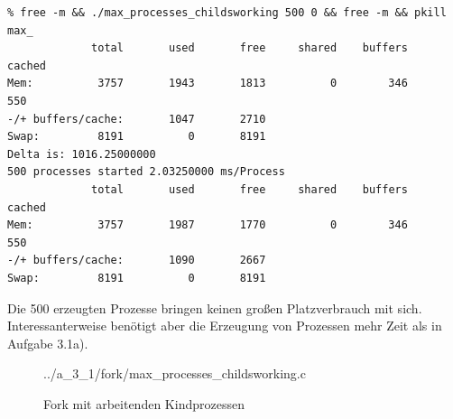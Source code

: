 \documentclass[a4paper,
12pt,
BCOR12mm,
]{scrartcl}
\begin{document}
\begin{verbatim}
% free -m && ./max_processes_childsworking 500 0 && free -m && pkill max_
             total       used       free     shared    buffers     cached
Mem:          3757       1943       1813          0        346        550
-/+ buffers/cache:       1047       2710
Swap:         8191          0       8191
Delta is: 1016.25000000
500 processes started 2.03250000 ms/Process
             total       used       free     shared    buffers     cached
Mem:          3757       1987       1770          0        346        550
-/+ buffers/cache:       1090       2667
Swap:         8191          0       8191
\end{verbatim}
Die 500 erzeugten Prozesse bringen keinen großen Platzverbrauch mit sich.
Interessanterweise benötigt aber die Erzeugung von Prozessen mehr Zeit als in Aufgabe
3.1a).
\begin{figure}[h!]
	\begin{center}
		 {../a_3_1/fork/max_processes_childsworking.c}
	\end{center}
	\caption{Fork mit arbeitenden Kindprozessen}
	\label{fig:fork_childsworking_listing}
\end{figure}
\end{document}
